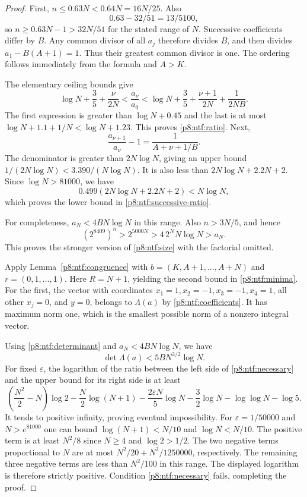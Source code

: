 \documentclass[11pt,a4paper]{article}
\theoremstyle{definition}
\theoremstyle{remark}
\numberwithin{equation}{section}
\begin{document}
\begin{proof}
First, $n\leq0.63N<0.64N=16N/25$.  Also
\[
 0.63-32/51=13/5100,
\]
so $n\geq0.63N-1>32N/51$ for the stated range of $N$.
Successive coefficients differ by $B$.  Any common divisor of all
$a_j$ therefore divides $B$, and then divides
$a_1-B(A+1)=1$.  Thus their greatest common divisor is one.
The ordering follows immediately from the formula and $A>K$.

The elementary ceiling bounds give
\[
 \log N+\frac35+\frac{\nu}{2N}
       <\frac{a_\nu}{a_0}
       <\log N+\frac35+\frac{\nu+1}{2N}+\frac1{2NB}.
\]
The first expression is greater than $\log N+0.45$ and the last
is at most $\log N+1.1+1/N<\log N+1.23$.  This proves
\eqref{p8:ntf:ratio}.  Next,
\[
 \frac{a_{\nu+1}}{a_\nu}-1=\frac1{A+\nu+1/B}.
\]
The denominator is greater than $2N\log N$, giving an upper
bound $1/(2N\log N)<3.390/(N\log N)$.  It is also less than
$2N\log N+2.2N+2$.  Since $\log N>81000$, we have
\[
 0.499(2N\log N+2.2N+2)<N\log N,
\]
which proves the lower bound in \eqref{p8:ntf:successive-ratio}.

For completeness, $a_N<4BN\log N$ in this range.  Also
$n>3N/5$, and hence
\[
 (2^{8409})^n>2^{5000N}>4\,2^N N\log N>a_N.
\]
This proves the stronger version of \eqref{p8:ntf:size} with the
factorial omitted.

Apply Lemma~\ref{p8:ntf:congruence} with
$b=(K,A+1,\ldots,A+N)$ and $r=(0,1,\ldots,1)$.
Here $R=N+1$, yielding the second bound in \eqref{p8:ntf:minima}.
For the first, the vector with coordinates $x_1=1,x_2=-1,x_3=-1,
x_4=1$, all other $x_j=0$, and $y=0$, belongs to $\Lambda(a)$
by \eqref{p8:ntf:coefficients}.  It has maximum norm one, which is
the smallest possible norm of a nonzero integral vector.

Using \eqref{p8:ntf:determinant} and $a_N<4BN\log N$, we have
\begin{equation}\label{p8:ntf:det-upper}
 \det\Lambda(a)<5B N^{3/2}\log N.
\end{equation}
For fixed $\varepsilon$, the logarithm of the ratio between the
left side of \eqref{p8:ntf:necessary} and the upper bound for its
right side is at least
\[
 \left(\frac{N^2}2-N\right)\log2
 -\frac N2\log(N+1)-\frac{2\varepsilon N}5\log N
 -\frac32\log N-\log\log N-\log5.
\]
It tends to positive infinity, proving eventual impossibility.
For $\varepsilon=1/50000$ and $N>e^{81000}$ one can bound
$\log(N+1)<N/10$ and $\log N<N/10$.  The positive term is
at least $N^2/8$ since $N\geq4$ and $\log2>1/2$.
The two negative terms proportional to $N$ are at most
$N^2/20+N^2/1250000$, respectively.  The remaining three
negative terms are less than $N^2/100$ in this range.
The displayed logarithm is therefore strictly positive.
Condition \eqref{p8:ntf:necessary} fails, completing the proof.
\end{proof}
\end{document}
